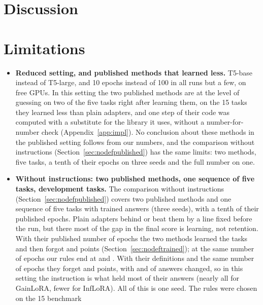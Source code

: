 \section{Discussion}
\label{sec:discussion}



\section{Limitations}
\label{sec:limits}

\begin{itemize}
  \item \textbf{Reduced setting, and published methods that learned less.} T5-base instead of T5-large, and 10 epochs instead of 100 in all runs but a few, on free GPUs. In this setting the two published methods are at the level
  of guessing on two of the five tasks right after learning them, on the 15 tasks they learned less
  than plain adapters, and one step of their code was
  computed with a substitute for the library it uses, without a number-for-number check
  (Appendix~\ref{app:impl}). No conclusion about these methods in the published setting follows from our numbers, and the
  comparison without instructions (Section~\ref{sec:nodefpublished}) has the same limits: two methods, five tasks, a tenth of their epochs on three seeds and the full number on one.
  \item \textbf{Without instructions: two published methods, one sequence of five tasks, development
  tasks.} The comparison without instructions (Section~\ref{sec:nodefpublished}) covers two
  published methods and one sequence of five tasks with trained answers (three seeds), with a tenth
  of their published epochs. Plain adapters behind \recog{} or \handicap{} beat them by a line fixed
  before the run, but there most of the gap in the final score is learning, not retention. With their
  published number of epochs the two methods learned the tasks and then forgot \AudFullGainloraFTInt{}
  and \AudFullInfloraFTInt{} points (Section~\ref{sec:nodeftrained}); at the same number of epochs our rules end at \AudFullOursRidgeAPOne{} and \AudFullOursHandicapAPOne{}. With their definitions and the same number of epochs they forget \AudFullDefOriginalGainloraFTOne{} and \AudFullDefOriginalInfloraFTOne{} points, with \AudFullDefOriginalGainloraChanged{} and \AudFullDefOriginalInfloraChanged{} of \AudFullDefCompared{} answers changed, so in this setting the instruction is what held most of their answers (nearly all for GainLoRA, fewer for InfLoRA). All of this is one seed. The rules were chosen on the 15 benchmark

\end{itemize}
